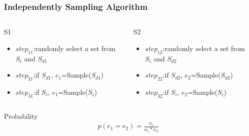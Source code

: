 \documentclass[notheorems, aspectratio=54]{beamer}
\begin{document}
\begin{frame}
    \frametitle{Independently Sampling Algorithm}
    \begin{columns}
        \begin{column}{0.48\textwidth}
            \begin{alertblock}{S1}
                \begin{itemize}
                    \item $step_{11}$:randomly select a set from $S_i$ and $S_{d1}$
                    \item $step_{21}$:if $S_{d1}$, $e_1$=Sample($S_{d1}$)
                    \item $step_{31}$:if $S_i$, $e_1$=Sample($S_{i}$)
                \end{itemize}
            \end{alertblock}
        \end{column}
        
        \begin{column}{0.48\textwidth}
        \begin{alertblock}{S2}
            \begin{itemize}
                \item $step_{12}$:randomly select a set from $S_i$ and $S_{d2}$
                \item $step_{22}$:if $S_{d2}$, $e_2$=Sample($S_{d2}$)
                \item $step_{32}$:if $S_i$, $e_2$=Sample($S_{i}$)
            \end{itemize}
        \end{alertblock}
        \end{column}
    
    \end{columns}

    \begin{block}{Probability}
    \begin{equation}
        \begin{aligned}
            p(e_1 = e_2) = \frac{n_i}{n_1*n_2}
        \end{aligned}
    \end{equation}
    \end{block}
\end{frame}
\end{document}
